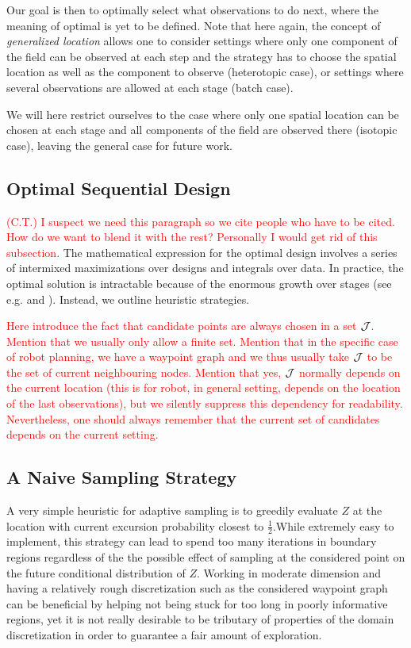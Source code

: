\documentclass[aoas]{imsart}
\begin{document}
Our goal is then to optimally select what observations to do next, where the meaning of optimal is yet to be defined. Note that here again, the concept of \textit{generalized location} allows one to consider settings where only one component of the field can be observed at each step and the strategy has to choose the spatial location as well as the component to observe (heterotopic case), or settings where several observations are allowed at each stage (batch case).

We will here restrict ourselves to the case where only one spatial location can be chosen at each stage and all components of the field are observed there (isotopic case), leaving the general case for future work.


\subsection{Optimal Sequential Design}
\label{Optdes}

\textcolor{red}{(C.T.) I suspect we need this paragraph so we cite people who have to be cited. How do we want to blend it with the rest? Personally I would get rid of this subsection.}
The mathematical expression for the optimal design involves a series
of intermixed maximizations over designs and integrals over data. In
practice, the optimal solution is intractable because of the enormous
growth over stages (see e.g. \cite{sucar2015probabilistic} and
\cite{powell2016perspectives}).  Instead, we outline heuristic
strategies.

\textcolor{red}{Here introduce the fact that candidate points are always chosen in a set $\mathcal{J}$. Mention that we usually only allow a finite set. Mention that in the specific case of robot planning, we have a waypoint graph and we thus usually take $\mathcal{J}$ to be the set of current neighbouring nodes. Mention that yes, $\mathcal{J}$ normally depends on the current location (this is for robot, in general setting, depends on the location of the last observations), but we silently suppress this dependency for readability. Nevertheless, one should always remember that the current set of candidates depends on the current setting.}
\subsection{A Naive Sampling Strategy}
\label{naive}

A very simple heuristic for adaptive sampling is to greedily evaluate $Z$ at the location with current excursion probability closest to $\frac{1}{2}$.While extremely easy to implement, this strategy can lead to spend too many iterations in boundary regions regardless of the the possible effect of sampling at the considered point on the future conditional distribution of $Z$. Working in moderate dimension and having a relatively rough discretization such as the considered waypoint graph can be beneficial by helping not being stuck for too long in poorly informative regions, yet it is not really desirable to be tributary of properties of the domain discretization in order to guarantee a fair amount of exploration.  
\end{document}
